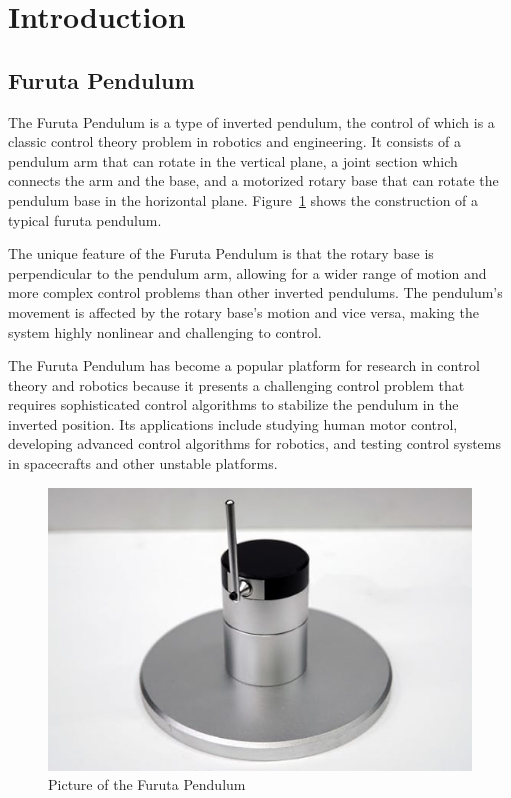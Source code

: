 \documentclass{LTHtwocol} %
\begin{document}
\section{Introduction}

\subsection{Furuta Pendulum}
The Furuta Pendulum is a type of inverted pendulum, the control of which is a classic control theory problem in robotics and engineering. It consists of a pendulum arm that can rotate in the vertical plane, a joint section which connects the arm and the base, and a motorized rotary base that can rotate the pendulum base in the horizontal plane. Figure~\ref{fig:furutapendulum} shows the construction of a typical furuta pendulum.

The unique feature of the Furuta Pendulum is that the rotary base is perpendicular to the pendulum arm, allowing for a wider range of motion and more complex control problems than other inverted pendulums. The pendulum's movement is affected by the rotary base's motion and vice versa, making the system highly nonlinear and challenging to control.

The Furuta Pendulum has become a popular platform for research in control theory and robotics because it presents a challenging control problem that requires sophisticated control algorithms to stabilize the pendulum in the inverted position. Its applications include studying human motor control, developing advanced control algorithms for robotics, and testing control systems in spacecrafts and other unstable platforms.

\begin{figure}[b]
	\centering
	\includegraphics[width=0.7\columnwidth]{pic/furutapendulum.jpg}
	\caption{Picture of the Furuta Pendulum}
	\label{fig:furutapendulum} %
\end{figure}
\end{document}
